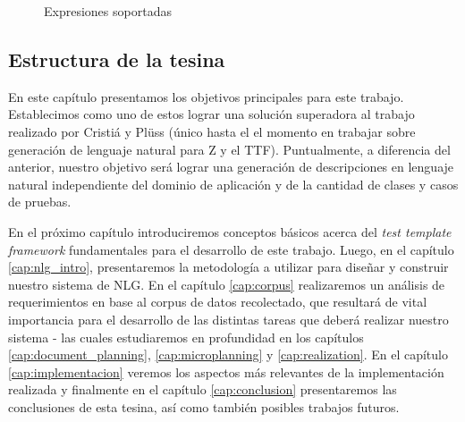 \begin{figure}[H]
  \caption{Expresiones soportadas}
  \label{fig:alcance}
\end{figure}

\subsection{Estructura de la tesina}
En este capítulo presentamos los objetivos principales para este trabajo. Establecimos como uno de estos lograr una solución superadora al trabajo realizado por Cristiá y Plüss \cite{cristia_pluss} (único hasta el el momento en trabajar sobre generación de lenguaje natural para Z y el TTF). Puntualmente, a diferencia del anterior, nuestro objetivo será lograr una generación de descripciones en lenguaje natural independiente del dominio de aplicación y de la cantidad de clases y casos de pruebas.

En el próximo capítulo introduciremos conceptos básicos acerca del \textit{test template framework} fundamentales para el desarrollo de este trabajo. Luego, en el capítulo \ref{cap:nlg_intro}, presentaremos la metodología a utilizar para diseñar y construir nuestro sistema de NLG. En el capítulo \ref{cap:corpus} realizaremos un análisis de requerimientos en base al corpus de datos recolectado, que resultará de vital importancia para el desarrollo de las distintas tareas que deberá realizar nuestro sistema - las cuales estudiaremos en profundidad en los capítulos \ref{cap:document_planning}, \ref{cap:microplanning} y \ref{cap:realization}. En el capítulo \ref{cap:implementacion} veremos los aspectos más relevantes de la implementación realizada y finalmente en el capítulo \ref{cap:conclusion} presentaremos las conclusiones de esta tesina, así como también posibles trabajos futuros.